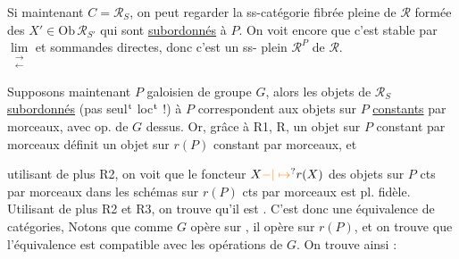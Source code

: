 Si maintenant $C=\mathscr R_S$, on peut regarder la ss-catégorie fibrée pleine de $\mathscr R$ formée des $X'\in\mathrm{Ob}\,\mathscr R_{S'}$ qui sont  \uline{subordonnés} à $P$. On voit encore que c'est stable par $\mathop{\mathrm{lim}}\limits_{\substack{\longrightarrow\\\longleftarrow}}$ et sommandes directes, donc c'est un ss-  plein $\mathscr R^P$ de $\mathscr R$.

Supposons maintenant $P$ galoisien de groupe $G$, alors les objets de $\mathscr R_S$ \uline{subordonnés} (pas seul$^{\rm t}$ loc$^{\rm t}$ !) à $P$ correspondent aux objets sur $P$ \uline{constants} par morceaux, avec op. de $G$ dessus. Or, grâce à R1, R, un objet  sur $P$ constant par morceaux définit un objet  sur $r(P)$ constant par morceaux, et

 utilisant de plus R2, on voit que le foncteur $X\unsure{-|\mapsto}r(X)$ des  objets sur $P$ cts par morceaux dans les schémas sur $r(P)$ cts par morceaux est pl. fidèle. Utilisant de plus R2 et R3, on trouve qu'il est . C'est donc une équivalence de catégories,
 Notons que comme $G$ opère sur , il opère sur $r(P)$,  et on trouve que l'équivalence est compatible avec les opérations de $G$. On trouve ainsi :

